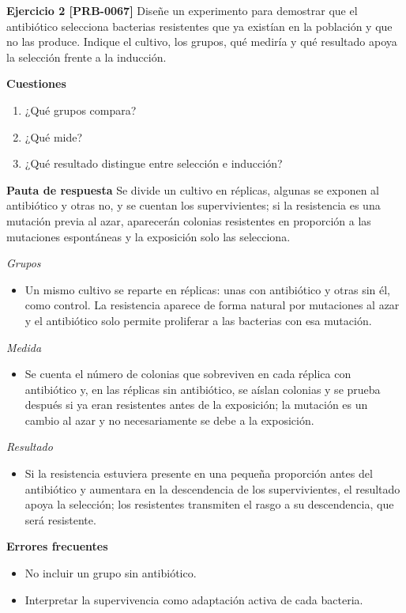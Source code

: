 \documentclass{book}
\begin{document}
\noindent\textbf{Ejercicio 2 [PRB-0067]}
Diseñe un experimento para demostrar que el antibiótico selecciona bacterias resistentes que ya existían en la población y que no las produce. Indique el cultivo, los grupos, qué mediría y qué resultado apoya la selección frente a la inducción.


\noindent\textbf{Cuestiones}
\begin{enumerate}
\item ¿Qué grupos compara?
\item ¿Qué mide?
\item ¿Qué resultado distingue entre selección e inducción?
\end{enumerate}

\noindent\textbf{Pauta de respuesta}
Se divide un cultivo en réplicas, algunas se exponen al antibiótico y otras no, y se cuentan los supervivientes; si la resistencia es una mutación previa al azar, aparecerán colonias resistentes en proporción a las mutaciones espontáneas y la exposición solo las selecciona.


\noindent\textit{Grupos}
\begin{itemize}
\item Un mismo cultivo se reparte en réplicas: unas con antibiótico y otras sin él, como control. La resistencia aparece de forma natural por mutaciones al azar y el antibiótico solo permite proliferar a las bacterias con esa mutación.
\end{itemize}

\noindent\textit{Medida}
\begin{itemize}
\item Se cuenta el número de colonias que sobreviven en cada réplica con antibiótico y, en las réplicas sin antibiótico, se aíslan colonias y se prueba después si ya eran resistentes antes de la exposición; la mutación es un cambio al azar y no necesariamente se debe a la exposición.
\end{itemize}

\noindent\textit{Resultado}
\begin{itemize}
\item Si la resistencia estuviera presente en una pequeña proporción antes del antibiótico y aumentara en la descendencia de los supervivientes, el resultado apoya la selección; los resistentes transmiten el rasgo a su descendencia, que será resistente.
\end{itemize}

\noindent\textbf{Errores frecuentes}
\begin{itemize}
\item No incluir un grupo sin antibiótico.
\item Interpretar la supervivencia como adaptación activa de cada bacteria.
\end{itemize}
\end{document}
